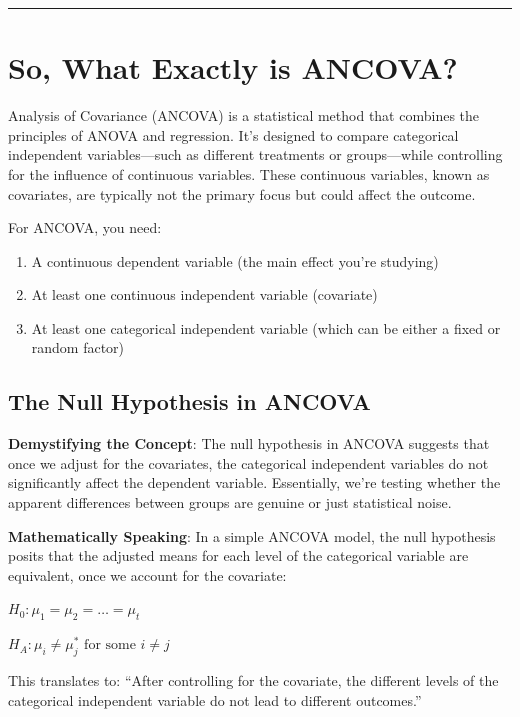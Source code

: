 \documentclass[
  letterpaper,
  DIV=11,
  numbers=noendperiod]{scrreprt}
\providecommand{\tightlist}{%
  \setlength{\itemsep}{0pt}\setlength{\parskip}{0pt}}
\begin{document}
\begin{center}\rule{0.5\linewidth}{0.5pt}\end{center}

\section{So, What Exactly is ANCOVA?}\label{so-what-exactly-is-ancova}

Analysis of Covariance (ANCOVA) is a statistical method that combines
the principles of ANOVA and regression. It's designed to compare
categorical independent variables---such as different treatments or
groups---while controlling for the influence of continuous variables.
These continuous variables, known as covariates, are typically not the
primary focus but could affect the outcome.

For ANCOVA, you need:

\begin{enumerate}
\def\labelenumi{\arabic{enumi})}
\tightlist
\item
  A continuous dependent variable (the main effect you're studying)
\item
  At least one continuous independent variable (covariate)
\item
  At least one categorical independent variable (which can be either a
  fixed or random factor)
\end{enumerate}

\subsection{The Null Hypothesis in
ANCOVA}\label{the-null-hypothesis-in-ancova}

\textbf{Demystifying the Concept}: The null hypothesis in ANCOVA
suggests that once we adjust for the covariates, the categorical
independent variables do not significantly affect the dependent
variable. Essentially, we're testing whether the apparent differences
between groups are genuine or just statistical noise.

\textbf{Mathematically Speaking}: In a simple ANCOVA model, the null
hypothesis posits that the adjusted means for each level of the
categorical variable are equivalent, once we account for the covariate:

\(H_0: \mu_1 = \mu_2 = \ldots = \mu_t\)

\(H_A: \mu_i \neq \mu_j^* \text{ for some } i \neq j\)

This translates to: ``After controlling for the covariate, the different
levels of the categorical independent variable do not lead to different
outcomes.''
\end{document}

